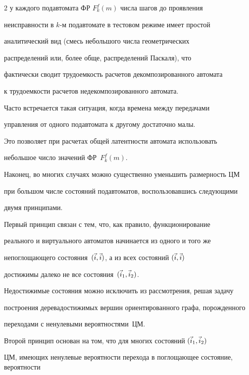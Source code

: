 \begin{multicols}{2}
у каждого подавтомата ФР $F^f_k(m)$ числа шагов до проявления


неисправности в $k$-м подавтомате в тестовом режиме имеет простой


аналитический вид (смесь небольшого числа геометрических


распределений или, более обще, распределений Паскаля), что


фактически сводит трудоемкость расчетов декомпозированного автомата


к трудоемкости расчетов недекомпозированного автомата.





Часто встречается такая ситуация, когда времена между передачами


управления от одного подавтомата к другому достаточно малы.


Это позволяет при расчетах общей латентности автомата использовать


небольшое число значений ФР~$F^f_k(m)$.





Наконец, во многих случаях можно существенно уменьшить размерность ЦМ


при большом числе состояний подавтоматов, воспользовавшись следующими


двумя принципами.





 Первый принцип связан с тем, что, как правило, функционирование


реального и виртуального автоматов начинается из одного и того же


непоглощающего со\-сто\-яния~$(\vec i,\vec i)$, а из всех состояний $(\vec i,\vec i)$


достижимы далеко не все со\-сто\-яния~$(\vec i_1,\vec i_2)$.


Не\-достижимые состояния можно исключить из рас\-смотре\-ния, решая задачу


построения дерева\linebreak достижимых вершин ориентированного графа, порожденного


переходами с ненулевыми ве\-ро\-ят\-ностя\-ми~ЦМ.





 Второй принцип основан на том, что для многих состояний $(\vec i_1,\vec i_2)$


ЦМ, имеющих ненулевые вероятности перехода в поглощающее состояние, вероятности



\end{multicols}
